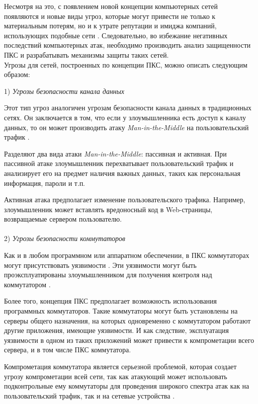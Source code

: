 \documentclass[../thesis.tex]{subfiles}
\begin{document}
Несмотря на это, с появлением новой концепции компьютерных сетей появляются и новые виды угроз, которые могут привести не только к материальным потерям, но и к утрате репутации и имиджа компаний, использующих подобные сети \cite{kloti2013openflow}.
Следовательно, во избежание негативных последствий компьютерных атак, необходимо производить анализ защищенности ПКС и разрабатывать механизмы защиты таких сетей.
\\

Угрозы для сетей, построенных по концепции ПКС, можно описать следующим образом:

1) \textit{Угрозы безопасности канала данных}

Этот тип угроз аналогичен угрозам безопасности канала данных в традиционных сетях.
Он заключается в том, что если у злоумышленника есть доступ к каналу данных, то он может производить атаку \textit{Man-in-the-Middle} на пользовательский трафик \cite{desmedt2011man}.

Разделяют два вида атаки \textit{Man-in-the-Middle}: пассивная и активная.
При пассивной атаке злоумышленник перехватывает пользовательский трафик и анализирует его на предмет наличия важных данных, таких как персональная информация, пароли и т.п.

Активная атака предполагает изменение пользовательского трафика.
Например, злоумышленник может вставлять вредоносный код в Web-страницы, возвращаемые сервером пользователю.
\\
\\

2) \textit{Угрозы безопасности коммутаторов}

Как и в любом программном или аппаратном обеспечении, в ПКС коммутаторах могут присутствовать уязвимости \cite{chao2016securing, garcia2014analysis}.
Эти уязвимости могут быть проэксплуатированы злоумышленником для получения контроля над коммутатором \cite{thimmaraju2016reins}.

Более того, концепция ПКС предполагает возможность использования программных коммутаторов.
Такие коммутаторы могут быть установлены на серверы общего назначения, на которых одновременно с коммутатором работают другие приложения, имеющие уязвимости.
И как следствие, эксплуатация уязвимости в одном из таких приложений может привести к компрометации всего сервера, и в том числе ПКС коммутатора.

Компрометация коммутатора является серьезной проблемой, которая создает угрозу компрометации всей сети, так как атакующий может использовать подконтрольные ему коммутаторы для проведения широкого спектра атак как на пользовательский трафик, так и на сетевые устройства \cite{neti2012software}.
\\
\end{document}
